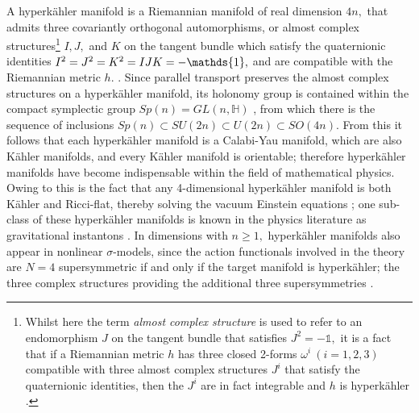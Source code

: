 \documentclass[a4paper,12pt, onecolumn, notitlepage]{article}
\theoremstyle{definition}
\theoremstyle{remark}
\newcommand{\w}{\omega}
\newcommand{\K}{K\"ahler }
\newcommand{\HK}{hyperk\"ahler }
\begin{document}
A \HK manifold is a Riemannian manifold of real dimension $4n,$ that admits three covariantly orthogonal automorphisms, or almost complex structures\footnote{Whilst here the term \emph{almost complex structure} is used to refer to an endomorphism $J$ on the tangent bundle that satisfies $J^{2}=-\mathds{1},$ it is a fact that if a Riemannian metric $h$ has three closed 2-forms $\w^{i}\ (i=1,2,3)$ compatible with three almost complex structures $J^{i}$ that satisfy the quaternionic identities, then the $J^{i}$ are in fact integrable and $h$ is \HK \cite{hitchin_1987}.} $I,J,$ and $K$ on the tangent bundle which satisfy the quaternionic identities $I\indices{^2}=J\indices{^2}=K\indices{^2}=IJK=-\mathds{1},$ and are compatible with the Riemannian metric $h.$ \cite{hitchin_1991}. Since parallel transport preserves the almost complex structures on a \HK manifold, its holonomy group is contained within the compact symplectic group $Sp(n) = GL(n,\mathbb{H})$ \cite{dancer_1994}, from which there is the sequence of inclusions $Sp(n)\subset SU(2n)\subset U(2n) \subset SO(4n).$ From this it follows that each \HK manifold is a Calabi-Yau manifold, which are also \K manifolds, and every \K manifold is orientable; therefore \HK manifolds have become indispensable within the field of mathematical physics. Owing to this is the fact that any 4-dimensional \HK manifold is both \K and Ricci-flat, thereby solving the vacuum Einstein equations \cite{hitchin_1991}; one sub-class of these \HK manifolds is known in the physics literature as gravitational instantons \cite{dancer_1994, eguchi_1978, gibbons_1978}.
In dimensions with $n\geq1,$ \HK manifolds also appear in nonlinear $\sigma$-models, since the action functionals involved in the theory are $N=4$ supersymmetric if and only if the target manifold is hyperk\"ahler; the three complex structures providing the additional three supersymmetries \cite{hitchin_1987}.
\end{document}
